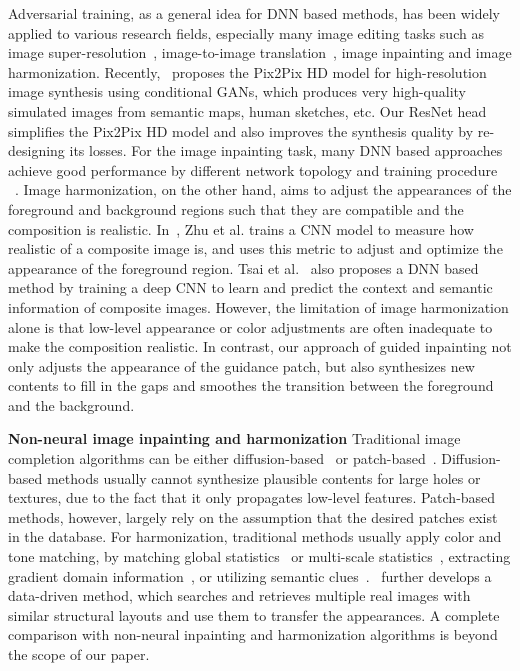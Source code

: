 \documentclass[runningheads]{llncs}
\begin{document}
Adversarial training, as a general idea for DNN based methods, has been widely applied to various research fields, especially many image editing tasks such as image super-resolution~\cite{kim2016accurate,dong2014learning,ledig2016photo}, image-to-image translation~\cite{isola2016image,zhu2017unpaired}, image inpainting and image harmonization. Recently,~\cite{wang2017high} proposes the Pix2Pix HD model for high-resolution image synthesis using conditional GANs, which produces very high-quality simulated images from semantic maps, human sketches, etc. Our ResNet head simplifies the Pix2Pix HD model and also improves the synthesis quality by re-designing its losses. For the image inpainting task, many DNN based approaches achieve good performance by different network topology and training procedure ~\cite{pathak2016context,yang2017high,yeh2016semantic,iizuka2017globally}. Image harmonization, on the other hand, aims to adjust the appearances of the foreground and background regions such that they are compatible and the composition is realistic. In~\cite{zhu2015learning}, Zhu et al. trains a CNN model to measure how realistic of a composite image is, and uses this metric to adjust and optimize the appearance of the foreground region. Tsai et al.~\cite{tsai2017deep} also proposes a DNN based method by training a deep CNN to learn and predict the context and semantic information of composite images. However, the limitation of image harmonization alone is that low-level appearance or color adjustments are often inadequate to make the composition realistic. In contrast, our approach of guided inpainting not only adjusts the appearance of the guidance patch, but also synthesizes new contents to fill in the gaps and smoothes the transition between the foreground and the background.

\noindent\textbf{Non-neural image inpainting and harmonization} Traditional image completion algorithms can be either diffusion-based~\cite{bertalmio2000image,elad2005simultaneous} or patch-based~\cite{bertalmio2003simultaneous,barnes2009patchmatch}. Diffusion-based methods usually cannot synthesize plausible contents for large holes or textures, due to the fact that it only propagates low-level features. Patch-based methods, however, largely rely on the assumption that the desired patches exist in the database. For harmonization, traditional methods usually apply color and tone matching, by matching global statistics~\cite{reinhard2001color} or multi-scale statistics~\cite{sunkavalli2010multi}, extracting gradient domain information~\cite{perez2003poisson,tao2010error}, or utilizing semantic clues~\cite{tsai2016sky}.~\cite{johnson2011cg2real} further develops a data-driven method, which searches and retrieves multiple real images with similar structural layouts and use them to transfer the appearances. A complete comparison with non-neural inpainting and harmonization algorithms is beyond the scope of our paper.
\end{document}
